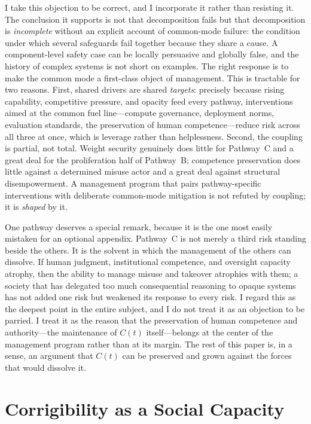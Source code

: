 \documentclass[11pt]{article}
\begin{document}
I take this objection to be correct, and I incorporate it rather than resisting it. The conclusion it supports is not that decomposition fails but that decomposition is \emph{incomplete} without an explicit account of common-mode failure: the condition under which several safeguards fail together because they share a cause. A component-level safety case can be locally persuasive and globally false, and the history of complex systems is not short on examples. The right response is to make the common mode a first-class object of management. This is tractable for two reasons. First, shared drivers are shared \emph{targets}: precisely because rising capability, competitive pressure, and opacity feed every pathway, interventions aimed at the common fuel line---compute governance, deployment norms, evaluation standards, the preservation of human competence---reduce risk across all three at once, which is leverage rather than helplessness. Second, the coupling is partial, not total. Weight security genuinely does little for Pathway~C and a great deal for the proliferation half of Pathway~B; competence preservation does little against a determined misuse actor and a great deal against structural disempowerment. A management program that pairs pathway-specific interventions with deliberate common-mode mitigation is not refuted by coupling; it is \emph{shaped} by it.

One pathway deserves a special remark, because it is the one most easily mistaken for an optional appendix. Pathway~C is not merely a third risk standing beside the others. It is the solvent in which the management of the others can dissolve. If human judgment, institutional competence, and oversight capacity atrophy, then the ability to manage misuse and takeover atrophies with them; a society that has delegated too much consequential reasoning to opaque systems has not added one risk but weakened its response to every risk. I regard this as the deepest point in the entire subject, and I do not treat it as an objection to be parried. I treat it as the reason that the preservation of human competence and authority---the maintenance of $C(t)$ itself---belongs at the center of the management program rather than at its margin. The rest of this paper is, in a sense, an argument that $C(t)$ can be preserved and grown against the forces that would dissolve it.

\section{Corrigibility as a Social Capacity}
\label{sec:corrigibility}
\end{document}
